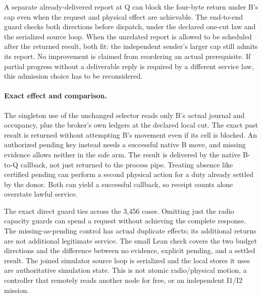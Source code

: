 \documentclass{article}
\begin{document}
A separate already-delivered report at Q can block the four-byte
return under B's cap even when the request and physical
effect are achievable. The end-to-end guard checks both
directions before dispatch, under the declared one-cut law and
the serialized source loop. When the unrelated report is
allowed to be scheduled after the returned result, both fit:
the independent sender's larger cap still admits its report.
No improvement is claimed from reordering an actual prerequisite.
If partial progress without a deliverable reply is required by a
different service law, this admission choice has to be reconsidered.

\paragraph{Exact effect and comparison.}
The singleton use of the unchanged selector reads only B's
actual journal and occupancy, plus the broker's own ledgers
at the declared local cut. The exact past result is returned
without attempting B's movement even if its cell is blocked.
An authorized pending key instead needs a successful native
B move, and missing evidence allows neither in the safe arm.
The result is delivered by the native B-to-Q callback, not
just returned to the process pipe. Treating absence like
certified pending can perform a second physical action for
a duty already settled by the donor. Both can yield a successful
callback, so receipt counts alone overstate lawful service.

The exact direct guard ties across the 3,456 cases.
Omitting just the radio capacity guards can spend a request
without achieving the complete response. The missing-as-pending
control has actual duplicate effects; its additional returns
are not additional legitimate service. The small Lean check
covers the two budget directions and the difference between
no evidence, explicit pending, and a settled result.
The joined simulator source loop is serialized and the local
stores it uses are authoritative simulation state. This is
not atomic radio/physical motion, a controller that remotely
reads another node for free, or an independent I1/I2 mission.
\end{document}
